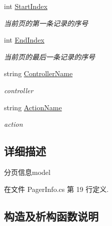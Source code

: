 \begin{DoxyCompactItemize}
int \hyperlink{class_x_c_l_net_tools_1_1_entity_1_1_pager_info_a659b36bf635a3fed41ee3b82ec4c2cbe}{Start\+Index}
\begin{DoxyCompactList}\small\item\em 当前页的第一条记录的序号 \end{DoxyCompactList}\item 
int \hyperlink{class_x_c_l_net_tools_1_1_entity_1_1_pager_info_a9d9af42d4a2c5da6386e089dbb1d33ea}{End\+Index}
\begin{DoxyCompactList}\small\item\em 当前页的最后一条记录的序号 \end{DoxyCompactList}\item 
string \hyperlink{class_x_c_l_net_tools_1_1_entity_1_1_pager_info_a7684b1dd21faadcf80c1e2d081660569}{Controller\+Name}
\begin{DoxyCompactList}\small\item\em controller \end{DoxyCompactList}\item 
string \hyperlink{class_x_c_l_net_tools_1_1_entity_1_1_pager_info_aa3c26ca4634e5ab5023cc0157e3245b7}{Action\+Name}
\begin{DoxyCompactList}\small\item\em action \end{DoxyCompactList}\end{DoxyCompactItemize}


\subsection{详细描述}
分页信息model 



在文件 Pager\+Info.\+cs 第 19 行定义.



\subsection{构造及析构函数说明}
\mbox{\label{class_x_c_l_net_tools_1_1_entity_1_1_pager_info_a775ef53e33f2270d097eb34e257dc925}} 
